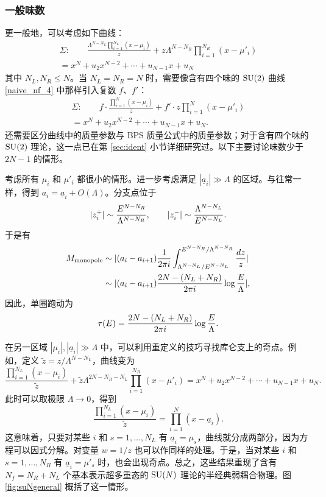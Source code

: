 \subsubsection{一般味数}
更一般地，可以考虑如下曲线：
\begin{multline}
\Sigma:\qquad
\frac{\Lambda^{N-N_L}\prod_{i=1}^{N_L}(x-\mu_i)}z
+z\Lambda^{N-N_R}\prod_{i=1}^{N_R}(x-\mu'_i)\\
=x^N+u_2x^{N-2}+\cdots+u_{N-1}x+u_N\label{suNNf}
\end{multline}
其中 $N_L,N_R\le N$。当 $N_L=N_R=N$ 时，需要像含有四个味的 $\mathop{\mathrm{SU}}(2)$ 曲线 \eqref{naive_nf_4} 中那样引入复数 $f$、$f'$：
\begin{multline}
\Sigma:\qquad
f\cdot\frac{\prod_{i=1}^N(x-\mu_i)}z
+f'\cdot z\prod_{i=1}^N(x-\mu'_i)\\
=x^N+u_2x^{N-2}+\cdots+u_{N-1}x+u_N.\label{suN-saturated}
\end{multline}
还需要区分曲线中的质量参数与 BPS 质量公式中的质量参数；对于含有四个味的 $\mathop{\mathrm{SU}}(2)$ 理论，这一点已在第 \ref{sec:ident} 小节详细研究过。以下主要讨论味数少于 $2N-1$ 的情形。

考虑所有 $\mu_i$ 和 $\mu'_i$ 都很小的情形。进一步考虑满足 $|\underline a_i|\gg\Lambda$ 的区域。与往常一样，得到 $a_i=\underline a_i+O(\Lambda)$。分支点位于
\begin{equation}
|z_i^+|\sim\frac{E^{N-N_R}}{\Lambda^{N-N_R}},\qquad
|z_i^-|\sim\frac{\Lambda^{N-N_L}}{E^{N-N_L}}.
\end{equation}
于是有
\begin{align}
M_\text{monopole}&\sim|(a_i-a_{i+1})\frac1{2\pi i}\int_{\Lambda^{N-N_L}/E^{N-N_L}}^{E^{N-N_R}/\Lambda^{N-N_R}}\frac{dz}z|\\
&\sim|(a_i-a_{i+1})\frac{2N-(N_L+N_R)}{2\pi i}\log\frac{E}\Lambda|,
\end{align}
因此，单圈跑动为
\begin{equation}
\tau(E)=\frac{2N-(N_L+N_R)}{2\pi i}\log\frac{E}\Lambda.
\end{equation}

在另一区域 $|\mu_i|,|\underline a_i|\gg\Lambda$ 中，可以利用重定义的技巧寻找库仑支上的奇点。例如，定义 $\tilde z=z/\Lambda^{N-N_L}$，曲线变为
\begin{equation}
\frac{\prod_{i=1}^{N_L}(x-\mu_i)}{\tilde z}
+\tilde z\Lambda^{2N-N_R-N_L}\prod_{i=1}^{N_R}(x-\mu'_i)
=x^N+u_2x^{N-2}+\cdots+u_{N-1}x+u_N.
\end{equation}
此时可以取极限 $\Lambda\to0$，得到
\begin{equation}
\frac{\prod_{i=1}^{N_L}(x-\mu_i)}{\tilde z}=\prod_{i=1}^N(x-\underline a_i).
\end{equation}
这意味着，只要对某些 $i$ 和 $s=1,\ldots,N_L$ 有 $\underline a_i=\mu_s$，曲线就分成两部分，因为方程可以因式分解。对变量 $w=1/z$ 也可以作同样的处理。于是，当对某些 $i$ 和 $s=1,\ldots,N_R$ 有 $\underline a_i=\mu'_s$ 时，也会出现奇点。总之，这些结果重现了含有 $N_f=N_R+N_L$ 个基本表示超多重态的 $\mathop{\mathrm{SU}}(N)$ 理论的半经典弱耦合物理。图 \ref{fig:suNgeneral} 概括了这一情形。

